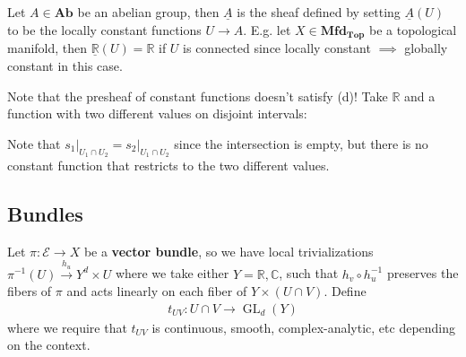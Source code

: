 \begin{example}

Let \(A\in {\mathbf{Ab}}\) be an abelian group, then \(\underline{A}\)
is the sheaf defined by setting \(\underline{A}(U)\) to be the locally
constant functions \(U\to A\). E.g. let
\(X \in {\mathbf{Mfd}}_{{\mathbf{Top}}}\) be a topological manifold,
then \(\underline{{\mathbb{R}}}(U) = {\mathbb{R}}\) if \(U\) is
connected since locally constant \(\implies\) globally constant in this
case.

\end{example}

\begin{warnings}

Note that the presheaf of constant functions doesn't satisfy (d)! Take
\({\mathbb{R}}\) and a function with two different values on disjoint
intervals:

\begin{figure}
\centering
{}
\end{figure}

Note that
\({ \left.{{s_1}} \right|_{{U_1 \cap U_2}} } = { \left.{{s_2}} \right|_{{U_1 \cap U_2}} }\)
since the intersection is empty, but there is no constant function that
restricts to the two different values.

\end{warnings}

\hypertarget{bundles}{%
\subsection{Bundles}\label{bundles}}

\begin{remark}

Let \(\pi: \mathcal{E}\to X\) be a \textbf{vector bundle}, so we have
local trivializations \(\pi ^{-1} (U) \xrightarrow{h_u} Y^d \times U\)
where we take either \(Y={\mathbb{R}}, {\mathbb{C}}\), such that
\(h_v \circ h_u ^{-1}\) preserves the fibers of \(\pi\) and acts
linearly on each fiber of \(Y\times(U \cap V)\). Define
\begin{align*}
t_{UV}: U \cap V \to \operatorname{GL}_d(Y)
\end{align*}
where we require that \(t_{UV}\) is continuous, smooth,
complex-analytic, etc depending on the context.

\begin{figure}
\centering
{}
\end{figure}

\end{remark}

